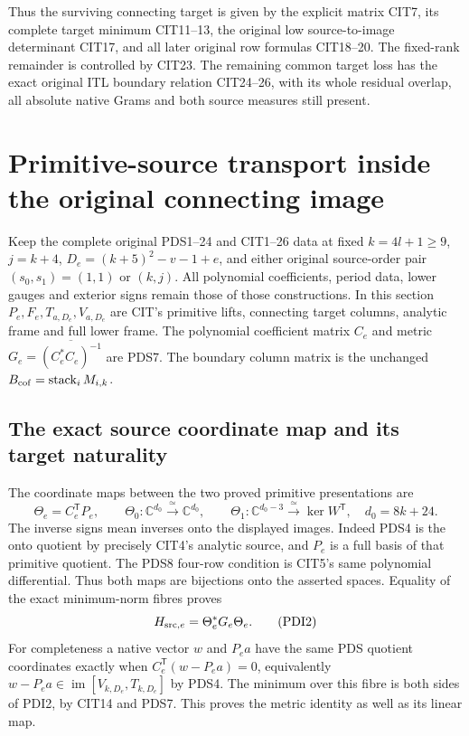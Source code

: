 \documentclass[10pt]{article}
\begin{document}
Thus the surviving connecting target is given by the explicit
matrix CIT7, its complete target minimum CIT11--13, the
original low source-to-image determinant CIT17, and all later
original row formulas CIT18--20. The fixed-rank remainder is
controlled by CIT23. The remaining common target loss has
the exact original ITL boundary relation CIT24--26, with its
whole residual overlap, all absolute native Grams and both
source measures still present.



\section{Primitive-source transport inside the original connecting image}
\label{sec:PDI}

Keep the complete original PDS1--24 and CIT1--26 data at fixed
$k=4l+1\ge9$, $j=k+4$, $D_e=(k+5)^2-v-1+e$, and either original
source-order pair $(s_0,s_1)=(1,1)$ or $(k,j)$. All polynomial
coefficients, period data, lower gauges and exterior signs remain
those of those constructions. In this section $P_e,F_e,T_{a,D_e},
V_{a,D_e}$ are CIT's primitive lifts, connecting target columns,
analytic frame and full lower frame. The polynomial coefficient
matrix $C_e$ and metric $G_e=\overline{(C_e^*C_e)^{-1}}$ are PDS7.
The boundary column matrix is the unchanged
$B_{\rm cof}=\operatorname{stack}_iM_{i,k}$.

\subsection{The exact source coordinate map and its target naturality}

The coordinate maps between the two proved primitive presentations are
\[
 \Theta_e=C_e^{\mathsf T}P_e,\qquad
 \Theta_0:\mathbb C^{d_0}\xrightarrow{\ \simeq\ }\mathbb C^{d_0},
 \qquad
 \Theta_1:\mathbb C^{d_0-3}\xrightarrow{\ \simeq\ }\ker W^{\mathsf T},
 \quad d_0=8k+24 .
 \tag{PDI1}
\]
The inverse signs mean inverses onto the displayed images.
Indeed PDS4 is the onto quotient by precisely CIT4's analytic
source, and $P_e$ is a full basis of that primitive quotient.
The PDS8 four-row condition is CIT5's same polynomial differential.
Thus both maps are bijections onto the asserted spaces. Equality
of the exact minimum-norm fibres proves
\[
 H_{{\rm src},e}=\Theta_e^*G_e\Theta_e .
 \tag{PDI2}
\]
For completeness a native vector $w$ and $P_ea$ have the same
PDS quotient coordinates exactly when
$C_e^{\mathsf T}(w-P_ea)=0$, equivalently
$w-P_ea\in\operatorname{im}[V_{k,D_e},T_{k,D_e}]$ by PDS4.
The minimum over this fibre is both sides of PDI2, by CIT14 and
PDS7. This proves the metric identity as well as its linear map.
\end{document}
